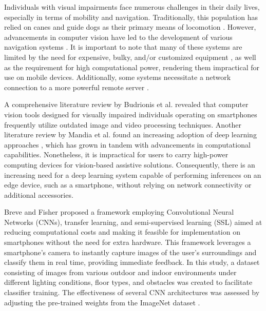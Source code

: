 \documentclass[preprint,12pt]{elsarticle}
\begin{document}
Individuals with visual impairments face numerous challenges in their daily lives, especially in terms of mobility and navigation. Traditionally, this population has relied on canes and guide dogs as their primary means of locomotion \cite{islam2019}. However, advancements in computer vision have led to the development of various navigation systems \cite{islam2019,mandia2023,budrionis2022,kuriakose2021,cardillo2019,bai2019,jiang2019,joe2019,hoang2017,tapu2017,saffoury2016,poggi2016,lakde2015}. It is important to note that many of these systems are limited by the need for expensive, bulky, and/or customized equipment \cite{hoang2017,tapu2017,saffoury2016,poggi2016,poggi2015,rizzo2017}, as well as the requirement for high computational power, rendering them impractical for use on mobile devices. Additionally, some systems necessitate a network connection to a more powerful remote server \cite{jiang2019,lin2017}.

A comprehensive literature review by Budrionis et al. \cite{budrionis2022} revealed that computer vision tools designed for visually impaired individuals operating on smartphones frequently utilize outdated image and video processing techniques. Another literature review by Mandia et al. \cite{mandia2023} found an increasing adoption of deep learning approaches \cite{lecun2015,goodfellow2016,schmidhuber2015}, which has grown in tandem with advancements in computational capabilities. Nonetheless, it is impractical for users to carry high-power computing devices for vision-based assistive solutions. Consequently, there is an increasing need for a deep learning system capable of performing inferences on an edge device, such as a smartphone, without relying on network connectivity or additional accessories.

Breve and Fisher \cite{breve2020} proposed a framework employing Convolutional Neural Networks (CNNs), transfer learning, and semi-supervised learning (SSL) aimed at reducing computational costs and making it feasible for implementation on smartphones without the need for extra hardware. This framework leverages a smartphone's camera to instantly capture images of the user's surroundings and classify them in real time, providing immediate feedback. In this study, a dataset consisting of images from various outdoor and indoor environments under different lighting conditions, floor types, and obstacles was created to facilitate classifier training. The effectiveness of several CNN architectures was assessed by adjusting the pre-trained weights from the ImageNet dataset \cite{russakovsky2015}.
\end{document}
